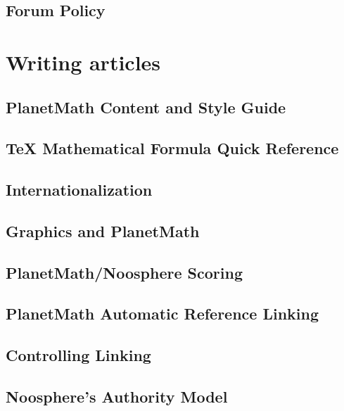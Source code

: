 \documentclass[12pt,report]{memoir}
\begin{document}
\section{Forum Policy}


\chapter{Writing articles}

\section{PlanetMath Content and Style Guide}


\section{TeX Mathematical Formula Quick Reference}


\section{Internationalization}


\section{Graphics and PlanetMath}


\section{PlanetMath/Noosphere Scoring}


\section{PlanetMath Automatic Reference Linking}


\section{Controlling Linking}


\section{Noosphere's Authority Model}

\end{document}
